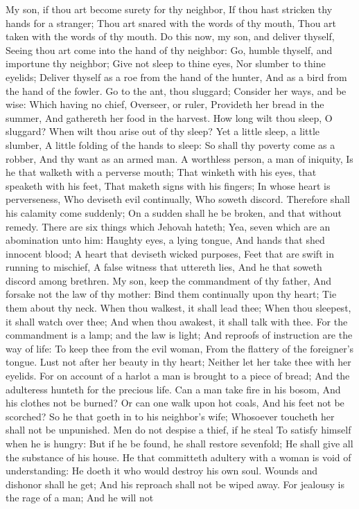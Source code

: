 My son, if thou art become surety for thy neighbor, If thou hast stricken thy hands for a stranger;  Thou art snared with the words of thy mouth, Thou art taken with the words of thy mouth.  Do this now, my son, and deliver thyself, Seeing thou art come into the hand of thy neighbor: Go, humble thyself, and importune thy neighbor;  Give not sleep to thine eyes, Nor slumber to thine eyelids;  Deliver thyself as a roe from the hand of the hunter, And as a bird from the hand of the fowler.  Go to the ant, thou sluggard; Consider her ways, and be wise:  Which having no chief, Overseer, or ruler,  Provideth her bread in the summer, And gathereth her food in the harvest.  How long wilt thou sleep, O sluggard? When wilt thou arise out of thy sleep?  Yet a little sleep, a little slumber, A little folding of the hands to sleep:  So shall thy poverty come as a robber, And thy want as an armed man.  A worthless person, a man of iniquity, Is he that walketh with a perverse mouth;  That winketh with his eyes, that speaketh with his feet, That maketh signs with his fingers;  In whose heart is perverseness, Who deviseth evil continually, Who soweth discord.  Therefore shall his calamity come suddenly; On a sudden shall he be broken, and that without remedy.  There are six things which Jehovah hateth; Yea, seven which are an abomination unto him:  Haughty eyes, a lying tongue, And hands that shed innocent blood;  A heart that deviseth wicked purposes, Feet that are swift in running to mischief,  A false witness that uttereth lies, And he that soweth discord among brethren.  My son, keep the commandment of thy father, And forsake not the law of thy mother:  Bind them continually upon thy heart; Tie them about thy neck.  When thou walkest, it shall lead thee; When thou sleepest, it shall watch over thee; And when thou awakest, it shall talk with thee.  For the commandment is a lamp; and the law is light; And reproofs of instruction are the way of life:  To keep thee from the evil woman, From the flattery of the foreigner’s tongue.  Lust not after her beauty in thy heart; Neither let her take thee with her eyelids.  For on account of a harlot a man is brought to a piece of bread; And the adulteress hunteth for the precious life.  Can a man take fire in his bosom, And his clothes not be burned?  Or can one walk upon hot coals, And his feet not be scorched?  So he that goeth in to his neighbor’s wife; Whosoever toucheth her shall not be unpunished.  Men do not despise a thief, if he steal To satisfy himself when he is hungry:  But if he be found, he shall restore sevenfold; He shall give all the substance of his house.  He that committeth adultery with a woman is void of understanding: He doeth it who would destroy his own soul.  Wounds and dishonor shall he get; And his reproach shall not be wiped away.  For jealousy is the rage of a man; And he will not 